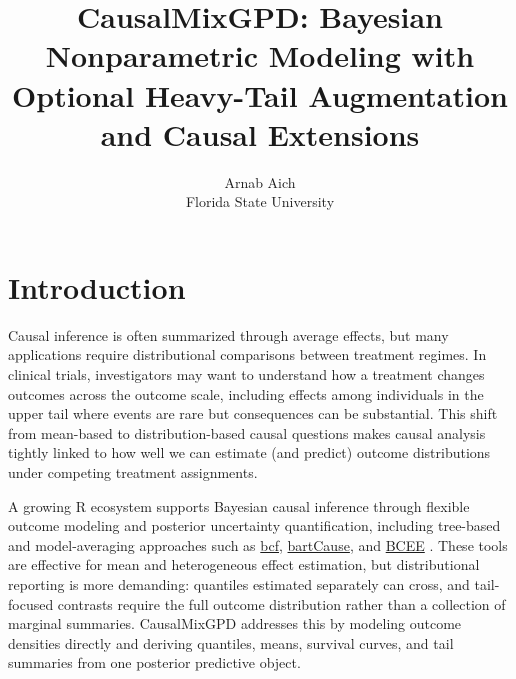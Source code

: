 \documentclass[article]{jss}\usepackage[]{graphicx}\usepackage[]{xcolor}
\author{Arnab Aich\\Florida State University}
\title{CausalMixGPD: Bayesian Nonparametric Modeling with Optional Heavy-Tail Augmentation and Causal Extensions}
\DeclareRobustCommand{\pkg}[1]{\textsf{#1}}
\begin{document}
\maketitle
\sloppy
\raggedbottom



\section{Introduction}
\label{sec:intro}

Causal inference is often summarized through average effects, but many
applications require distributional comparisons between treatment
regimes. In clinical trials, investigators may want to understand how a
treatment changes outcomes across the outcome scale, including effects
among individuals in the upper tail where events are rare but
consequences can be substantial. This shift from mean-based to
distribution-based causal questions makes causal analysis tightly linked
to how well we can estimate (and predict) outcome distributions under
competing treatment assignments.

A growing \textsf{R} ecosystem supports Bayesian causal inference
through flexible outcome modeling and posterior uncertainty
quantification, including tree-based and model-averaging approaches such
as \href{https://cran.r-project.org/package=bcf}{\textsf{bcf}},
\href{https://cran.r-project.org/package=bartCause}{\textsf{bartCause}},
and \href{https://cran.r-project.org/package=BCEE}{\textsf{BCEE}}
\citep{bcf_pkg,bartCause_pkg,BCEE_pkg}.
These tools are effective for mean and heterogeneous effect estimation,
but distributional reporting is more demanding: quantiles estimated
separately can cross, and tail-focused contrasts require the full
outcome distribution rather than a collection of marginal summaries.
\pkg{CausalMixGPD} addresses this by modeling outcome densities directly
and deriving quantiles, means, survival curves, and tail summaries from
one posterior predictive object.
\end{document}
